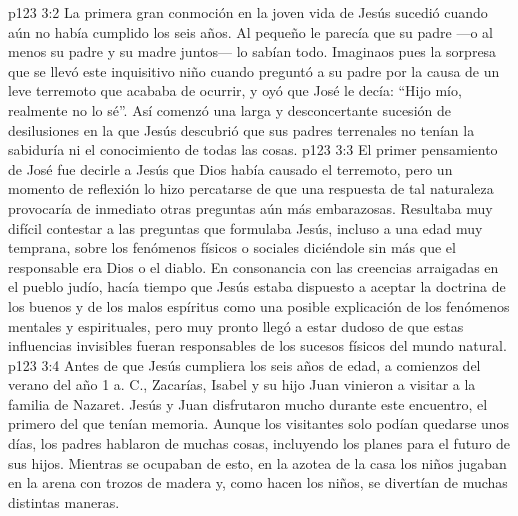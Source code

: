 \vs p123 3:2 \pc La primera gran conmoción en la joven vida de Jesús sucedió cuando aún no había cumplido los seis años. Al pequeño le parecía que su padre ---o al menos su padre y su madre juntos--- lo sabían todo. Imaginaos pues la sorpresa que se llevó este inquisitivo niño cuando preguntó a su padre por la causa de un leve terremoto que acababa de ocurrir, y oyó que José le decía: “Hijo mío, realmente no lo sé”. Así comenzó una larga y desconcertante sucesión de desilusiones en la que Jesús descubrió que sus padres terrenales no tenían la sabiduría ni el conocimiento de todas las cosas.
\vs p123 3:3 El primer pensamiento de José fue decirle a Jesús que Dios había causado el terremoto, pero un momento de reflexión lo hizo percatarse de que una respuesta de tal naturaleza provocaría de inmediato otras preguntas aún más embarazosas. Resultaba muy difícil contestar a las preguntas que formulaba Jesús, incluso a una edad muy temprana, sobre los fenómenos físicos o sociales diciéndole sin más que el responsable era Dios o el diablo. En consonancia con las creencias arraigadas en el pueblo judío, hacía tiempo que Jesús estaba dispuesto a aceptar la doctrina de los buenos y de los malos espíritus como una posible explicación de los fenómenos mentales y espirituales, pero muy pronto llegó a estar dudoso de que estas influencias invisibles fueran responsables de los sucesos físicos del mundo natural.
\vs p123 3:4 \pc Antes de que Jesús cumpliera los seis años de edad, a comienzos del verano del año 1 a. C., Zacarías, Isabel y su hijo Juan vinieron a visitar a la familia de Nazaret. Jesús y Juan disfrutaron mucho durante este encuentro, el primero del que tenían memoria. Aunque los visitantes solo podían quedarse unos días, los padres hablaron de muchas cosas, incluyendo los planes para el futuro de sus hijos. Mientras se ocupaban de esto, en la azotea de la casa los niños jugaban en la arena con trozos de madera y, como hacen los niños, se divertían de muchas distintas maneras.
